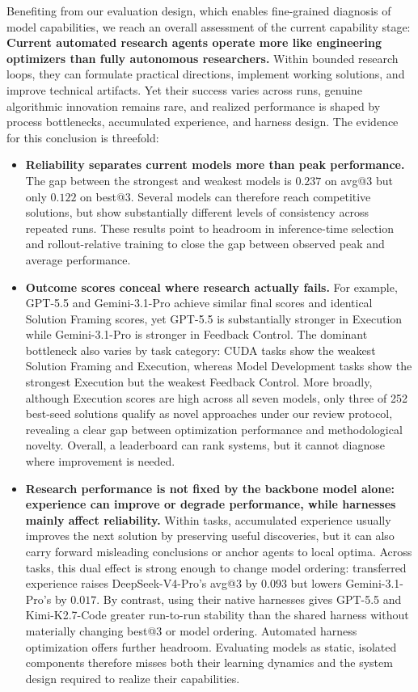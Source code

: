 Benefiting from our evaluation design, which enables fine-grained diagnosis of model capabilities, we reach an overall assessment of the current capability stage:
\textbf{Current automated research agents operate more like engineering optimizers than fully autonomous researchers.}
Within bounded research loops, they can formulate practical directions, implement working solutions, and improve technical artifacts.
Yet their success varies across runs, genuine algorithmic innovation remains rare, and realized performance is shaped by process bottlenecks, accumulated experience, and harness design.
The evidence for this conclusion is threefold:
\begin{itemize}
    \item \textbf{Reliability separates current models more than peak performance.}
    The gap between the strongest and weakest models is $0.237$ on avg@3 but only $0.122$ on best@3.
    Several models can therefore reach competitive solutions, but show substantially different levels of consistency across repeated runs.
    These results point to headroom in inference-time selection and rollout-relative training to close the gap between observed peak and average performance.

    \item \textbf{Outcome scores conceal where research actually fails.}
    For example, GPT-5.5 and Gemini-3.1-Pro achieve similar final scores and identical Solution Framing scores, yet GPT-5.5 is substantially stronger in Execution while Gemini-3.1-Pro is stronger in Feedback Control.
    The dominant bottleneck also varies by task category: CUDA tasks show the weakest Solution Framing and Execution, whereas Model Development tasks show the strongest Execution but the weakest Feedback Control.
    More broadly, although Execution scores are high across all seven models, only three of 252 best-seed solutions qualify as novel approaches under our review protocol, revealing a clear gap between optimization performance and methodological novelty.
    Overall, a leaderboard can rank systems, but it cannot diagnose where improvement is needed.


    \item \textbf{Research performance is not fixed by the backbone model alone: experience can improve or degrade performance, while harnesses mainly affect reliability.}
    Within tasks, accumulated experience usually improves the next solution by preserving useful discoveries, but it can also carry forward misleading conclusions or anchor agents to local optima.
    Across tasks, this dual effect is strong enough to change model ordering: transferred experience raises DeepSeek-V4-Pro's avg@3 by $0.093$ but lowers Gemini-3.1-Pro's by $0.017$.
    By contrast, using their native harnesses gives GPT-5.5 and Kimi-K2.7-Code greater run-to-run stability than the shared harness without materially changing best@3 or model ordering.
    Automated harness optimization offers further headroom.
    Evaluating models as static, isolated components therefore misses both their learning dynamics and the system design required to realize their capabilities.
    
\end{itemize}




